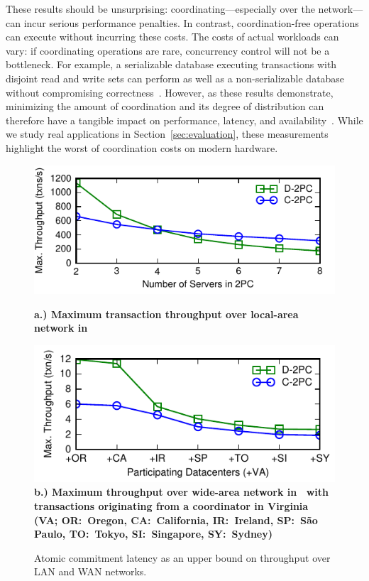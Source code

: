 These results should be unsurprising: coordinating---especially over
the network---can incur serious performance penalties. In contrast,
coordination-free operations can execute without incurring these
costs. The costs of actual workloads can vary: if coordinating
operations are rare, concurrency control will not be a bottleneck. For
example, a serializable database executing transactions with disjoint
read and write sets can perform as well as a non-serializable database
without compromising correctness~\cite{shore-communication}. However,
as these results demonstrate, minimizing the amount of coordination
and its degree of distribution can therefore have a tangible impact on
performance, latency, and
availability~\cite{pacelc,hat-vldb,gilbert-cap}. While we study real
applications in Section~\ref{sec:evaluation}, these measurements
highlight the worst of coordination costs on modern hardware.

\begin{figure}
  \includegraphics[width=\columnwidth]{figs/singledc-twopc.pdf}\\
  {\centering \textbf{\scriptsize a.) Maximum transaction
      throughput over local-area network in~\cite{bobtail}}\par}
  \includegraphics[width=\columnwidth]{figs/multidc-twopc.pdf}\\
  \textbf{\scriptsize b.) Maximum throughput over wide-area network
    in~\cite{hat-vldb} with transactions originating from a
    coordinator in Virginia (VA; OR:~Oregon, CA:~California,
    IR:~Ireland, SP:~S\~{a}o Paulo, TO:~Tokyo, SI:~Singapore,
    SY:~Sydney)}

\caption{Atomic commitment latency as an upper bound on throughput
  over LAN and WAN networks.}
\label{fig:2pc}
\end{figure}


